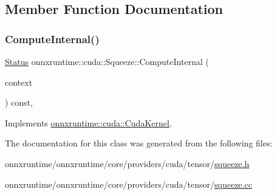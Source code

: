 \subsection{Member Function Documentation}
\mbox{\label{classonnxruntime_1_1cuda_1_1Squeeze_a73b6b12616870d3b63a35b4c9854b4ad}} 
\subsubsection{\texorpdfstring{Compute\+Internal()}{ComputeInternal()}}
{\footnotesize\ttfamily \mbox{\hyperlink{classonnxruntime_1_1common_1_1Status}{Status}} onnxruntime\+::cuda\+::\+Squeeze\+::\+Compute\+Internal (\begin{DoxyParamCaption}\item[{\mbox{\hyperlink{classonnxruntime_1_1OpKernelContext}{Op\+Kernel\+Context}} $\ast$}]{context }\end{DoxyParamCaption}) const\hspace{0.3cm}{\ttfamily [override]}, {\ttfamily [virtual]}}



Implements \mbox{\hyperlink{classonnxruntime_1_1cuda_1_1CudaKernel_aca7af04ae448017d6023d30bba231ebb}{onnxruntime\+::cuda\+::\+Cuda\+Kernel}}.



The documentation for this class was generated from the following files\+:\begin{DoxyCompactItemize}
\item 
onnxruntime/onnxruntime/core/providers/cuda/tensor/\mbox{\hyperlink{cuda_2tensor_2squeeze_8h}{squeeze.\+h}}\item 
onnxruntime/onnxruntime/core/providers/cuda/tensor/\mbox{\hyperlink{cuda_2tensor_2squeeze_8cc}{squeeze.\+cc}}\end{DoxyCompactItemize}
